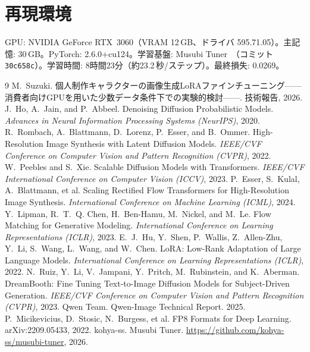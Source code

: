 \documentclass[10pt,twocolumn]{ltjsarticle}
\begin{document}
\section{再現環境}
GPU: NVIDIA GeForce RTX~3060（VRAM 12\,GB、ドライバ 595.71.05）。主記憶: 30\,GB。PyTorch: 2.6.0+cu124。学習基盤: Musubi Tuner~\cite{musubi2026}（コミット \texttt{30c658c}）。学習時間: 8時間23分（約23.2\,秒/ステップ）。最終損失: 0.0269。

\begin{thebibliography}{9}
 M.~Suzuki. 個人制作キャラクターの画像生成LoRAファインチューニング——消費者向けGPUを用いた少数データ条件下での実験的検討——. 技術報告, 2026.
 J.~Ho, A.~Jain, and P.~Abbeel. Denoising Diffusion Probabilistic Models. \textit{Advances in Neural Information Processing Systems (NeurIPS)}, 2020.
 R.~Rombach, A.~Blattmann, D.~Lorenz, P.~Esser, and B.~Ommer. High-Resolution Image Synthesis with Latent Diffusion Models. \textit{IEEE/CVF Conference on Computer Vision and Pattern Recognition (CVPR)}, 2022.
 W.~Peebles and S.~Xie. Scalable Diffusion Models with Transformers. \textit{IEEE/CVF International Conference on Computer Vision (ICCV)}, 2023.
 P.~Esser, S.~Kulal, A.~Blattmann, et al. Scaling Rectified Flow Transformers for High-Resolution Image Synthesis. \textit{International Conference on Machine Learning (ICML)}, 2024.
 Y.~Lipman, R.~T.~Q. Chen, H.~Ben-Hamu, M.~Nickel, and M.~Le. Flow Matching for Generative Modeling. \textit{International Conference on Learning Representations (ICLR)}, 2023.
 E.~J.~Hu, Y.~Shen, P.~Wallis, Z.~Allen-Zhu, Y.~Li, S.~Wang, L.~Wang, and W.~Chen. LoRA: Low-Rank Adaptation of Large Language Models. \textit{International Conference on Learning Representations (ICLR)}, 2022.
 N.~Ruiz, Y.~Li, V.~Jampani, Y.~Pritch, M.~Rubinstein, and K.~Aberman. DreamBooth: Fine Tuning Text-to-Image Diffusion Models for Subject-Driven Generation. \textit{IEEE/CVF Conference on Computer Vision and Pattern Recognition (CVPR)}, 2023.
 Qwen Team. Qwen-Image Technical Report. 2025.
 P.~Micikevicius, D.~Stosic, N.~Burgess, et al. FP8 Formats for Deep Learning. arXiv:2209.05433, 2022.
 kohya-ss. Musubi Tuner. \url{https://github.com/kohya-ss/musubi-tuner}, 2026.
\end{thebibliography}
\end{document}
